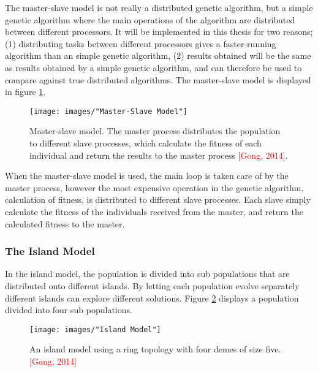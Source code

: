 The master-slave model is not really a distributed genetic algorithm, but a simple genetic algorithm where the main operations of the algorithm are distributed between different processors. It will be implemented in this thesis for two reasons; (1) distributing tasks between different processors gives a faster-running algorithm than an simple genetic algorithm, (2) results obtained will be the same as results obtained by a simple genetic algorithm, and can therefore be used to compare against true distributed algorithms. The master-slave model is displayed in figure \ref{Master-Slave Model}.\\


\begin{figure}[h!]
\begin{center}
\texttt{[image: images/"Master-Slave Model"]}
\caption{Master-slave model. The master process distributes the population to different slave processes, which calculate the fitness of each individual and return the results to the master process \textcolor{red}{[Gong, 2014]}.}
\label{Master-Slave Model}
\end{center}
\end{figure}


\noindent When the master-slave model is used, the main loop is taken care of by the master process, however the most expensive operation in the genetic algorithm, calculation of fitness, is distributed to different slave processes. Each slave simply calculate the fitness of the individuals received from the master, and return the calculated fitness to the master. 


\subsubsection{The Island Model}
In the island model, the population is divided into sub populations that are distributed onto different islands. By letting each population evolve separately different islands can explore different solutions. Figure \ref{Island model} displays a population divided into four sub populations. \\ 


\begin{figure}[h!]
\begin{center}
\texttt{[image: images/"Island Model"]}
\caption{An island model using a ring topology with four demes of size five. \textcolor{red}{[Gong, 2014]}}
\label{Island model}
\end{center}
\end{figure}


